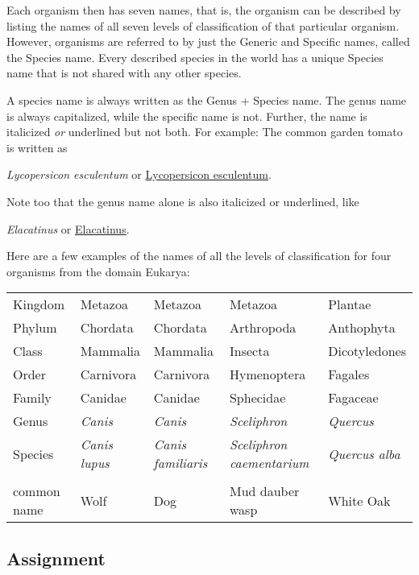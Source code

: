 \documentclass[11pt]{exam}
\begin{document}
Each organism then has seven names, that is, the organism can be
described by listing the names of all seven levels of classification of
that particular organism. However, organisms are referred to by just the
Generic and Specific names, called the Species name. Every described species
in the world has a unique Species name that is not shared with any other species.

A species name is always written as the Genus + Species name. The genus
name is always capitalized, while the specific name is not. Further, the
name is italicized \emph{or} underlined but not both. For example: The
common garden tomato is written as \smallskip

\hspace{1em}\emph{Lycopersicon esculentum} or \uline{Lycopersicon esculentum}.\bigskip

Note too that the genus name alone is also italicized or underlined, like \medskip

\hspace{1em}\emph{Elacatinus} or \uline{Elacatinus}.\bigskip

Here are a few examples of the names of all the levels of classification
for four organisms from the domain Eukarya:

\begin{longtable}[c]{@{}lllll@{}}
\toprule
Kingdom & Metazoa & Metazoa & Metazoa & Plantae\tabularnewline
Phylum & Chordata & Chordata & Arthropoda &
Anthophyta\tabularnewline
Class & Mammalia & Mammalia & Insecta &
Dicotyledones\tabularnewline
Order & Carnivora & Carnivora & Hymenoptera &
Fagales\tabularnewline
Family & Canidae & Canidae & Sphecidae &
Fagaceae\tabularnewline
Genus & \emph{Canis} & \emph{Canis} & \emph{Sceliphron} &
\emph{Quercus}\tabularnewline
Species & \emph{Canis lupus} & \emph{Canis familiaris} &
\emph{Sceliphron caementarium} & \emph{Quercus alba}\tabularnewline
 & & & &\tabularnewline
common name & Wolf & Dog & Mud dauber wasp & White
Oak\tabularnewline
\bottomrule
\end{longtable}


\subsection*{Assignment}
\end{document}
